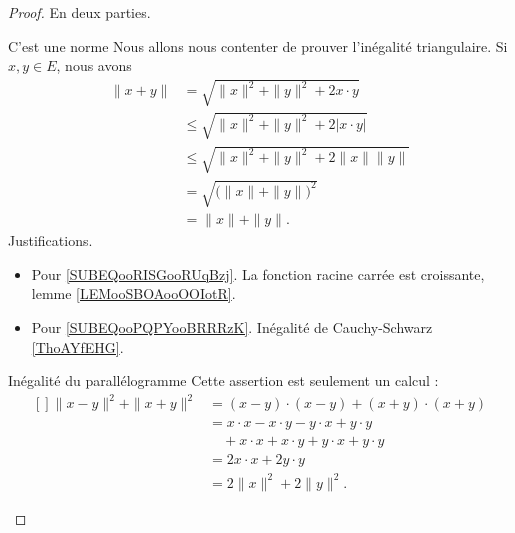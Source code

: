 \begin{proof}
    En deux parties.
    \begin{subproof}
        \item[C'est une norme]
            Nous allons nous contenter de prouver l'inégalité triangulaire. Si \( x,y\in E\),  nous avons
        \begin{subequations}
            \begin{align}
                \| x+y \|&=\sqrt{ \| x \|^2+\| y \|^2+2x\cdot y }\\
                &\leq\sqrt{ \| x \|^2+\| y \|^2+2| x\cdot y | } \label{SUBEQooRISGooRUqBzj}\\
                &\leq\sqrt{ \| x \|^2+\| y \|^2+2\| x \|\| y \| }       \label{SUBEQooPQPYooBRRRzK}\\
                &=\sqrt{ \big( \| x \|+\| y \| \big)^2 }\\
                &=\| x \|+\| y \|.
            \end{align}
        \end{subequations}
        Justifications.
        \begin{itemize}
            \item Pour \eqref{SUBEQooRISGooRUqBzj}. La fonction racine carrée est croissante, lemme \ref{LEMooSBOAooOOIotR}.
            \item Pour \eqref{SUBEQooPQPYooBRRRzK}. Inégalité de Cauchy-Schwarz \ref{ThoAYfEHG}.
        \end{itemize}

        \item[Inégalité du parallélogramme]
            Cette assertion est seulement un calcul :
            \begin{equation}
                \begin{aligned}[]
                    \| x-y \|^2+\| x+y \|^2&=(x-y)\cdot (x-y)+(x+y)\cdot(x+y)\\
                    &=x\cdot x-x\cdot y-y\cdot x+y\cdot y\\
                    &\quad +x\cdot x+x\cdot y+y\cdot x+y\cdot y\\
                    &=2x\cdot x+2y\cdot y\\
                    &=2\| x \|^2+2\| y \|^2.
                \end{aligned}
            \end{equation}
    \end{subproof}
\end{proof}

